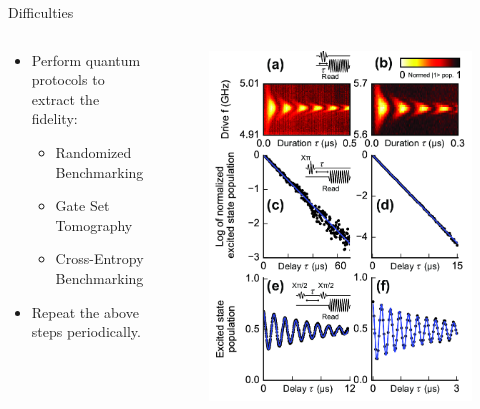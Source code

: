 \documentclass[11p,aspectratio=169]{beamer}
\begin{document}
\begin{frame}{Difficulties}
\begin{columns}
\begin{column}{0.5 \textwidth}
\begin{itemize}
\begin{itemize}
                \end{itemize}
                \item[\faCaretSquareORight] Perform quantum protocols to extract the fidelity:
                \begin{itemize}
                    \item[\faWrench] Randomized Benchmarking
                    \item[\faWrench] Gate Set Tomography
                    \item[\faWrench] Cross-Entropy Benchmarking
                \end{itemize}
                \item[\faCaretSquareORight] Repeat the above steps periodically.
            \end{itemize}
        \end{column}
        \begin{column}{0.5 \textwidth}
            \begin{figure}
                \includegraphics[width = 0.8 \textwidth]{figures/characterization.png}
            \end{figure}
            
        \end{column}
    \end{columns}
    

\end{frame}
\end{document}

